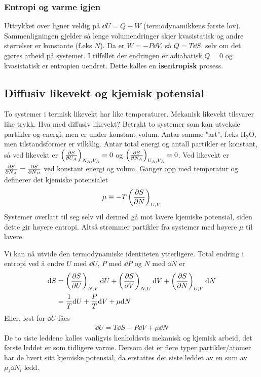 \documentclass[12pt]{article}
\begin{document}
\subsubsection{Entropi og varme igjen}
Uttrykket over ligner veldig på $\dd U = Q + W$ (termodynamikkens første lov).
Sammenligningen gjelder så lenge volumendringer skjer kvasistatisk og andre
størrelser er konstante (f.eks $N$). Da er $W = -P \dd V$, så $Q = T \dd S$,
selv om det gjøres arbeid på systemet. I tilfellet der endringen er adiabatisk $Q = 0$
og kvasistatisk er entropien uendret. Dette kalles en \textbf{isentropisk} prosess.
\subsection{Diffusiv likevekt og kjemisk potensial}
To systemer i termisk likevekt har like temperaturer. Mekanisk likevekt tilsvarer
like trykk. Hva med diffusiv likevekt? Betrakt to systemer som kan utveksle
partikler og energi, men er under konstant volum. Antar samme "art", f.eks $\text{H}_2\text{O}$,
men tilstandsformer er vilkålig. Antar total energi og antall partikler er konstant,
så ved likevekt er $\left( \pdv{S}{U_A} \right)_{N_A, V_A} = 0$ og $\left( \pdv{S}{N_A} \right)_{U_A, V_A} = 0$.
Ved likevekt er $\pdv{S}{N_A} = \pdv{S}{N_B}$ ved konstant energi og volum. Ganger opp
med temperatur og definerer det kjemiske potensialet
\begin{align*}
  \mu \equiv - T \left(\pdv{S}{N} \right)_{U,V}
\end{align*}
Systemer overlatt til seg selv vil dermed gå mot lavere kjemiske potensial, siden
dette gir høyere entropi. Altså strømmer partikler fra systemer med høyere $\mu$
til lavere.

Vi kan nå utvide den termodynamiske identiteten ytterligere. Total endring i entropi
ved å endre $U$ med $\dd U$, $P$ med $\dd P$ og $N$ med $\dd N$ er
\begin{align*}
  \dd S &= \left( \pdv{S}{U} \right)_{N, V} \dd U + \left( \pdv{S}{V} \right)_{N, U} \dd V + \left( \pdv{S}{N} \right)_{U, V} \dd N\\
        &= \frac{1}{T} \dd U + \frac{P}{T} \dd V + \mu \dd N
\end{align*}
Eller, løst for $\dd U$ fåes
\begin{align*}
  \dd U = T \dd S - P \dd V + \mu \dd N
\end{align*}
De to siste leddene kalles vanligvis henholdsvis mekanisk og kjemisk arbeid, det
første leddet er som tidligere varme. Dersom det er flere typer partikler/atomer
har de hvert sitt kjemiske potensial, da erstattes det siste leddet av en sum
av $\mu_i \dd N_i$ ledd.
\end{document}

